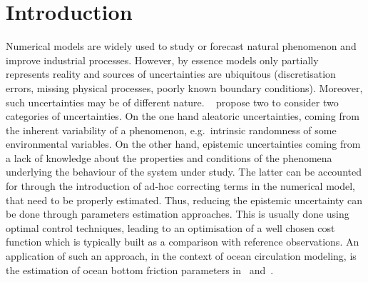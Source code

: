 \documentclass[preprint, 1p]{elsarticle}
\newcommand{\arthur}[1]{{\itshape\color{cyan} ({#1})}}
\newcommand{\victor}[1]{{\itshape\color{green} ({#1})}}
\begin{document}

\section*{Introduction}
\label{}



Numerical models are widely used to study or forecast natural phenomenon and improve industrial processes. However, by essence models only partially represents reality and sources of uncertainties are ubiquitous (discretisation errors, missing physical processes, poorly known boundary conditions).
%
Moreover, such uncertainties may be of different nature. 
~\cite{walker_defining_2003} propose two to consider two categories of uncertainties. On the one hand aleatoric uncertainties,  coming from the inherent variability of a phenomenon, e.g.\ intrinsic randomness of some environmental variables. On the other hand, epistemic uncertainties coming from a lack of knowledge about the properties and conditions of the phenomena underlying the behaviour of the system under study.
The latter can be accounted for through the introduction of ad-hoc correcting terms in the numerical model, that need to be properly estimated. Thus, reducing the epistemic uncertainty can be done through parameters estimation approaches. 
This is usually done using optimal control techniques, leading to an optimisation of a well chosen cost function which is typically built as a comparison with reference observations.
%
An application of such an approach, in the context of ocean circulation modeling, is the estimation of ocean bottom friction parameters in~\cite{das_estimation_1991} and~\cite{boutet_estimation_2015}. 
\end{document}
